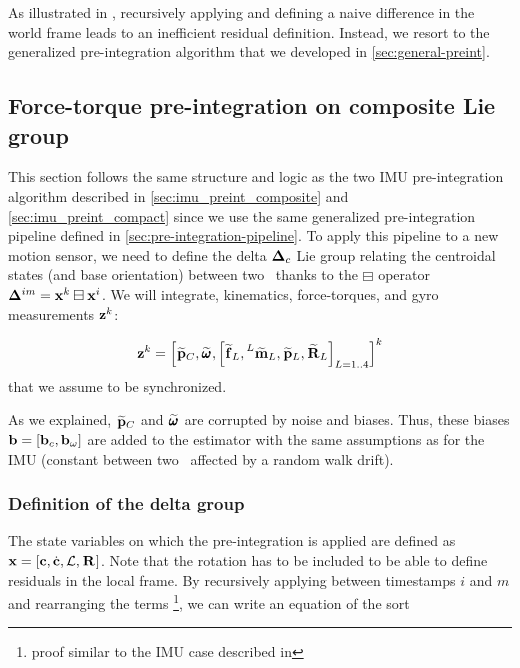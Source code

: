 As illustrated in , recursively applying  and defining a naive difference in the world frame leads to an inefficient
residual definition. Instead, we resort to the generalized pre-integration algorithm that we developed in \ref{sec:general-preint}.






\subsection{Force-torque pre-integration on composite Lie group}

This section follows the same structure and logic as the two IMU pre-integration algorithm described in \ref{sec:imu_preint_composite} and \ref{sec:imu_preint_compact} since
we use the same generalized pre-integration pipeline defined in \ref{sec:pre-integration-pipeline}. 
To apply this pipeline to a new motion sensor, we need to define the delta ${{\bm \Delta}}_c$ Lie group relating the centroidal states (and base orientation) between two \keyframes\ thanks to the $\boxminus$ operator 
${{\bm \Delta}}^{im}={\bf x}^k\boxminus{\bf x}^i$. We will integrate, kinematics, force-torques, and gyro measurements ${\bf z}^k$:

\begin{equation}
    {\bf z}^k = \left[ \prescript{}{}{\widetilde{{\bf p}}}_{C}, \prescript{}{}{\widetilde{\pmb{\omega}}}_{}, \left[\prescript{}{}{\widetilde{{\bf f}}}_{L}, \prescript{L}{}{\widetilde{\bf m}}_{L}, \prescript{}{}{\widetilde{{\bf p}}}_{L}, \prescript{}{}{\widetilde{{\bf R}}}_{L} \right]_{L=1..4}\right]^k
\end{equation}
%
that we assume to be synchronized.

As we explained, $\prescript{}{}{\widetilde{{\bf p}}}_{C}$ and $\prescript{}{}{\widetilde{\pmb{\omega}}}_{}$ are corrupted by noise and biases. Thus, these biases  ${\bf b} = [{\bf b}_c, {\bf b}_{\omega}]$ are added to the estimator
with the same assumptions as for the IMU (constant between two \keyframes\, affected by a random walk drift).


\subsubsection{Definition of the delta group}

The state variables on which the pre-integration is applied are defined as ${\bf x}=[{\bf c}, \dot{{\bf c}}, \mathcal{L}, \prescript{}{}{{\bf R}}_{}]$.
Note that the rotation has to be included to be able to define residuals in the local frame.
By recursively applying  between timestamps $i$ and $m$ and rearranging the terms \footnote{proof similar to the IMU case described in 
}, we can write an equation of the sort 

